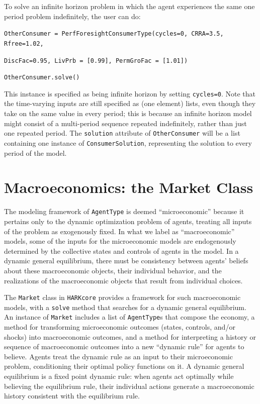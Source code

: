 \documentclass[12pt,titlepage,letterpaper]{econtex}
\begin{document}
\vspace{0.25cm}

To solve an infinite horizon problem in which the agent experiences the same one period problem indefinitely, the user can do:

\vspace{0.25cm}

\noindent \texttt{OtherConsumer = PerfForesightConsumerType(cycles=0, CRRA=3.5, Rfree=1.02,}

\texttt{DiscFac=0.95, LivPrb = [0.99], PermGroFac = [1.01])}

\noindent \texttt{OtherConsumer.solve()}

\vspace{0.25cm}

This instance is specified as being infinite horizon by setting \texttt{cycles=0}.  Note that the time-varying inputs are still specified as (one element) lists, even though they take on the same value in every period; this is because an infinite horizon model might consist of a multi-period sequence repeated indefinitely, rather than just one repeated period.  The \texttt{solution} attribute of \texttt{OtherConsumer} will be a list containing one instance of \texttt{ConsumerSolution}, representing the solution to every period of the model.

\section{Macroeconomics: the Market Class}\label{sec:Macroeconomics}

The modeling framework of \texttt{AgentType} is deemed ``microeconomic'' because it pertains only to the dynamic optimization problem of agents, treating all inputs of the problem as exogenously fixed.  In what we label as ``macroeconomic'' models, some of the inputs for the microeconomic models are endogenously determined by the collective states and controls of agents in the model.  In a dynamic general equilibrium, there must be consistency between agents' beliefs about these macroeconomic objects, their individual behavior, and the realizations of the macroeconomic objects that result from individual choices.

The \texttt{Market} class in \texttt{HARKcore} provides a framework for such macroeconomic models, with a \texttt{solve} method that searches for a dynamic general equilibrium.  An instance of \texttt{Market} includes a list of \texttt{AgentType}s that compose the economy, a method for transforming microeconomic outcomes (states, controls, and/or shocks) into macroeconomic outcomes, and a method for interpreting a history or sequence of macroeconomic outcomes into a new ``dynamic rule'' for agents to believe.  Agents treat the dynamic rule as an input to their microeconomic problem, conditioning their optimal policy functions on it.  A dynamic general equilibrium is a fixed point dynamic rule: when agents act optimally while believing the equilibrium rule, their individual actions generate a macroeconomic history consistent with the equilibrium rule.
\end{document}
